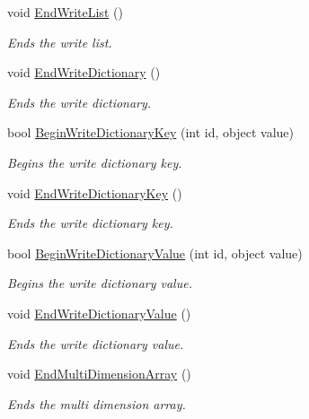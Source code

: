 \begin{DoxyCompactItemize}
void \hyperlink{class_serialization_1_1_binary_serializer_a71b4595291913c4cdc62b860da2ffa7c}{End\+Write\+List} ()
\begin{DoxyCompactList}\small\item\em Ends the write list. \end{DoxyCompactList}\item 
void \hyperlink{class_serialization_1_1_binary_serializer_a16b991b1614cfe83fbb7479b0de03368}{End\+Write\+Dictionary} ()
\begin{DoxyCompactList}\small\item\em Ends the write dictionary. \end{DoxyCompactList}\item 
bool \hyperlink{class_serialization_1_1_binary_serializer_a07ccc4cc72e4c414f60de04ace5a6459}{Begin\+Write\+Dictionary\+Key} (int id, object value)
\begin{DoxyCompactList}\small\item\em Begins the write dictionary key. \end{DoxyCompactList}\item 
void \hyperlink{class_serialization_1_1_binary_serializer_a82fe2baa2c969b618c2729a8113edaa1}{End\+Write\+Dictionary\+Key} ()
\begin{DoxyCompactList}\small\item\em Ends the write dictionary key. \end{DoxyCompactList}\item 
bool \hyperlink{class_serialization_1_1_binary_serializer_a4dc4587767b33a9c6310da4de7314cc8}{Begin\+Write\+Dictionary\+Value} (int id, object value)
\begin{DoxyCompactList}\small\item\em Begins the write dictionary value. \end{DoxyCompactList}\item 
void \hyperlink{class_serialization_1_1_binary_serializer_ad8d7709505dfa6e3e973223411397fa0}{End\+Write\+Dictionary\+Value} ()
\begin{DoxyCompactList}\small\item\em Ends the write dictionary value. \end{DoxyCompactList}\item 
void \hyperlink{class_serialization_1_1_binary_serializer_a93ce28fd88cc7a06daac35287b46664b}{End\+Multi\+Dimension\+Array} ()
\begin{DoxyCompactList}\small\item\em Ends the multi dimension array. \end{DoxyCompactList}\item 

\end{DoxyCompactItemize}
